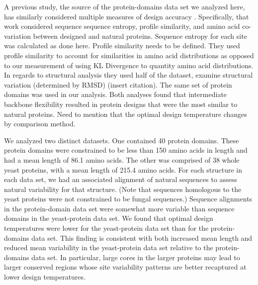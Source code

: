 \documentclass[12pt]{article}
\begin{document}
A previous study, the source of the protein-domains data set we analyzed here, has similarly considered multiple measures of design accuracy \citep{OllikainenKortemme}. Specifically, that work considered sequence sequence entropy, profile similarity, and amino acid co-variation between designed and natural proteins. Sequence entropy for each site was calculated as done here. {\color{red}Profile similarity needs to be defined.} They used profile similarity to account for similarities in amino acid distributions as opposed to our measurement of using KL Divergence to quantity amino acid distributions. {\color{blue}In regards to structural analysis they used half of the dataset, examine structural variation (determined by RMSD) (insert citation).}  The same set of protein domains was used in our analysis.  Both analyses found that intermediate backbone flexibility resulted in protein designs that were the most similar to natural proteins. {\color{green}Need to mention that the optimal design temperature changes by comparison method.}

We analyzed two distinct datasets. One contained 40 protein domains. These protein domains were constrained to be less than 150 amino acids in length and had a mean length of 86.1 amino acids. The other was comprised of 38 whole yeast proteins, with a mean length of 215.4 amino acids. For each structure in each data set, we had an associated alignment of natural sequences to assess natural variability for that structure. (Note that sequences homologous to the yeast proteins were not constrained to be fungal sequences.) Sequence alignments in the protein-domain data set were somewhat more variable than sequence domains in the yeast-protein data set. We found that optimal design temperatures were lower for the yeast-protein data set than for the protein-domains data set. This finding is consistent with both increased mean length and reduced mean variability in the yeast-protein data set relative to the protein-domains data set. In particular, large cores in the larger proteins may lead to larger conserved regions whose site variability patterns are better recaptured at lower design temperatures. 
\end{document}
